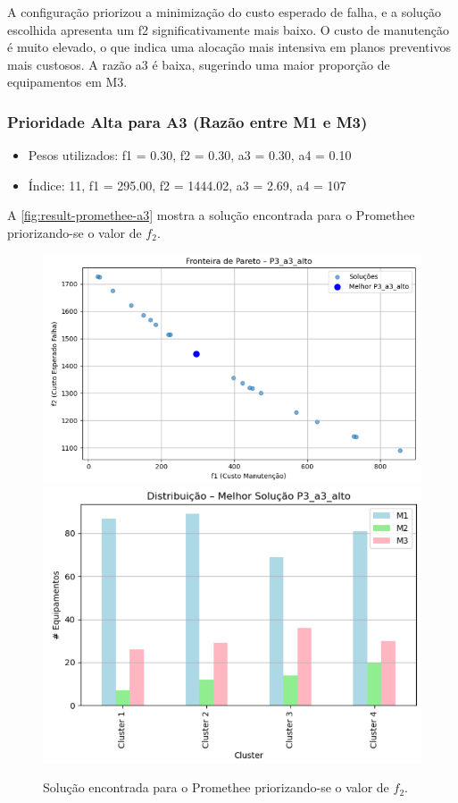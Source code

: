 \documentclass[conference]{IEEEtran}
\begin{document}
A configuração priorizou a minimização do custo esperado de falha, e a solução escolhida apresenta um f2 significativamente mais baixo. O custo de manutenção é muito elevado, o que indica uma alocação mais intensiva em planos preventivos mais custosos. A razão a3 é baixa, sugerindo uma maior proporção de equipamentos em M3.

\subsubsection{Prioridade Alta para A3 (Razão entre M1 e M3)}

\begin{itemize}
	\item Pesos utilizados:  f1 = 0.30, f2 = 0.30, a3 = 0.30, a4 = 0.10
	\item Índice: 11, f1 = 295.00, f2 = 1444.02, a3 = 2.69, a4 = 107
\end{itemize}

A \autoref{fig:result-promethee-a3} mostra a solução encontrada para o Promethee 
priorizando-se o valor de $f_2$.


\begin{figure}[htbp]
    \centering
    \includegraphics[width=\columnwidth,trim=1 1 1 1,clip]{../images/fronteira-promethee-a3.png}
    \includegraphics[width=\columnwidth,trim=1 1 1 1,clip]{../images/result-promethee-a3.png}
    \caption{\label{fig:result-promethee-a3}
	Solução encontrada para o Promethee 
priorizando-se o valor de $f_2$.}
\end{figure}
\end{document}
